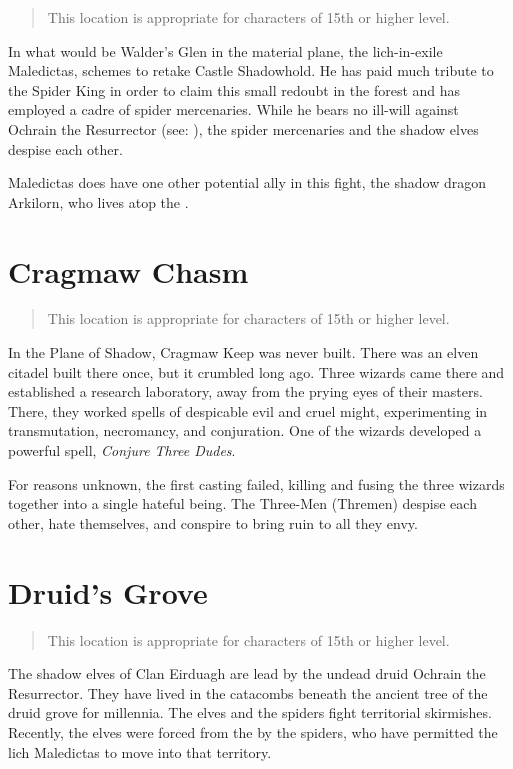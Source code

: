 \begin{quote}
  This location is appropriate for characters of 15th or higher level.
\end{quote}

In what would be Walder's Glen in the material plane, the lich-in-exile Maledictas,
schemes to retake Castle Shadowhold. He has paid much tribute to the Spider King
in order to claim this small redoubt in the forest and has employed a cadre of spider
mercenaries. While he bears no ill-will against Ochrain the Resurrector
(see: ), the spider
mercenaries and the shadow elves despise each other.

Maledictas does have one other potential ally in this fight, the shadow dragon
Arkilorn, who lives atop the .

\section{Cragmaw Chasm} \label{loc:cragmawchasm}

\begin{quote}
  This location is appropriate for characters of 15th or higher level.
\end{quote}

In the Plane of Shadow, Cragmaw Keep was never built. There was an elven citadel
built there once, but it crumbled long ago. Three wizards came there and established
a research laboratory, away from the prying eyes of their masters. There, they worked
spells of despicable evil and cruel might, experimenting in transmutation, necromancy,
and conjuration. One of the wizards developed a powerful spell, \textit{Conjure Three Dudes}.

For reasons unknown, the first casting failed, killing and fusing the three wizards
together into a single hateful being. The Three-Men (Thremen) despise each other,
hate themselves, and conspire to bring ruin to all they envy.

\section{Druid's Grove} \label{loc:druidsgrove}

\begin{quote}
  This location is appropriate for characters of 15th or higher level.
\end{quote}

The shadow elves of Clan Eirduagh are lead by the undead druid Ochrain the Resurrector.
They have lived in the catacombs beneath the ancient tree of the druid grove for
millennia. The elves and the spiders fight territorial skirmishes. Recently, the elves
were forced from the  by the spiders, who have permitted the lich
Maledictas to move into that territory.

